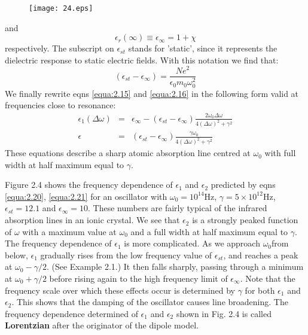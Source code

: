 \documentclass[12pt]{book}
\begin{document}
\begin{figure}[htbp]
  \texttt{[image: 24.eps]}\\
  \label{fig:2.4}
\end{figure}

and
\begin{equation}\label{equa:2.18}
  \epsilon_r(\infty)\equiv\epsilon_{\infty}=1+\chi
\end{equation}
respectively. The subscript on $\epsilon_{st}$ stands for 'static', since it represents the dielectric response to static electric fields. With this notation we find that:
\begin{equation}\label{equa:2.19}
  (\epsilon_{st}-\epsilon_{\infty})=\frac{Ne^2}{\epsilon_0m_0\omega_0^2}
\end{equation}
We finally rewrite eqns \ref{equa:2.15} and \ref{equa:2.16} in the following form valid at frequencies close to resonance:
\begin{eqnarray}
  \epsilon_1(\Delta\omega) &=& \epsilon_{\infty}-(\epsilon_{st}-\epsilon_{\infty})\frac{2\omega_0\Delta\omega}{4(\Delta\omega)^2+\gamma^2}  \label{equa:2.20}\\
  \epsilon &=& (\epsilon_{st}-\epsilon_{\infty})\frac{\gamma\omega_0}{4(\Delta\omega)^2+\gamma^2} \label{equa:2.21}
\end{eqnarray}
These equations describe a sharp atomic absorption line centred at $\omega_0$ with full width at half maximum equal to $\gamma$.

Figure 2.4 shows the frequency dependence of $\epsilon_1$ and $\epsilon_2$ predicted by eqns \ref{equa:2.20}, \ref{equa:2.21} for an oscillator with $\omega_0 = 10^{14}$Hz, $\gamma = 5\times10^{12}$Hz, $\epsilon_{st}=12.1$ and $\epsilon_{\infty}=10$. These numbers are fairly typical of the infrared absorption lines in an ionic crystal. We see that $\epsilon_2$ is a strongly peaked function of $\omega$ with a maximum value at $\omega_0$ and a full width at half maximum equal to $\gamma$. The frequency dependence of $\epsilon_1$ is more complicated. As we approach $\omega_0$from below, $\epsilon_1$ gradually rises from the low frequency value of $\epsilon_{st}$, and reaches a peak at $\omega_0-\gamma/2$. (See Example 2.1.) It then falls sharply, passing through a minimum at $\omega_0+\gamma/2$ before rising again to the high frequency limit of $\epsilon_{\infty}$. Note that the frequency scale over which these effects occur is determined by $\gamma$ for both $\epsilon_1$ and $\epsilon_2$. This shows that the damping of the oscillator causes line broadening. The frequency dependence determined of $\epsilon_1$ and $\epsilon_2$ shown in Fig. 2.4 is called \textbf{Lorentzian} after the originator of the dipole model.
\end{document}
